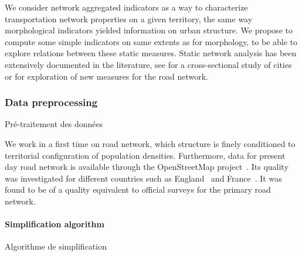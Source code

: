 


We consider network aggregated indicators as a way to characterize transportation network properties on a given territory, the same way morphological indicators yielded information on urban structure. We propose to compute some simple indicators on same extents as for morphology, to be able to explore relations between these static measures. Static network analysis has been extensively documented in the literature, see \cite{louf2014typology} for a cross-sectional study of cities or \cite{2015arXiv151201268L} for exploration of new measures for the road network.


\subsubsection{Data preprocessing}{Pré-traitement des données}

We work in a first time on road network, which structure is finely conditioned to territorial configuration of population densities. Furthermore, data for present day road network is available through the OpenStreetMap project~\cite{openstreetmap}. Its quality was investigated for different countries such as England~\cite{haklay2010good} and France~\cite{girres2010quality}. It was found to be of a quality equivalent to official surveys for the primary road network.





\paragraph{Simplification algorithm}{Algorithme de simplification}

